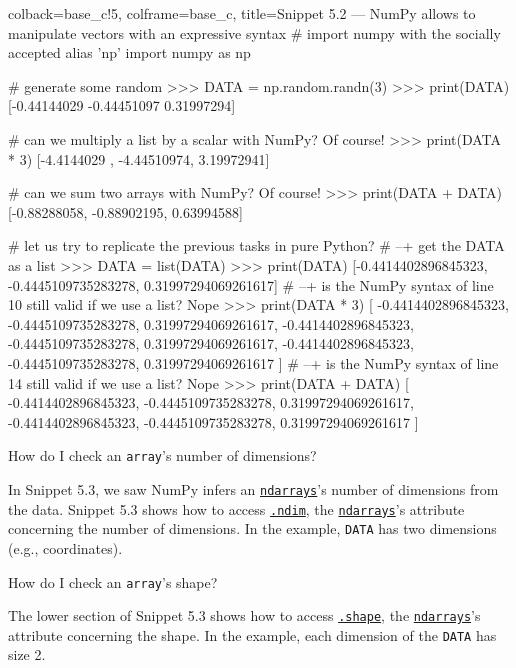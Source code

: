 \documentclass[a4paper,11pt]{book}
\newcommand{\question}[1]{%
    \begin{tcolorbox}[colback=comp_c!10,colframe=comp_c,sidebyside align=top,width=\linewidth,before skip=1ex]
        #1
    \end{tcolorbox}
    \switchcolumn%
}
\newcommand{\note}[1]{%
    \begin{tcolorbox}[colback=white!0,colframe=white!10,width=\linewidth,before skip=1ex]
        #1
    \end{tcolorbox}
}
\begin{document}
\begin{pythoncode}[linenos=true,]{colback=base_c!5, colframe=base_c, title=\sffamily Snippet 5.2 --- NumPy allows to manipulate vectors with an expressive syntax}
# import numpy with the socially accepted alias 'np'
import numpy as np

# generate some random
>>> DATA = np.random.randn(3)
>>> print(DATA)
[-0.44144029 -0.44451097  0.31997294]

# can we multiply a list by a scalar with NumPy? Of course!
>>> print(DATA * 3)
[-4.4144029 , -4.44510974,  3.19972941]

# can we sum two arrays with NumPy? Of course!
>>> print(DATA + DATA) 
[-0.88288058, -0.88902195,  0.63994588]

# let us try to replicate the previous tasks in pure Python?
# --+ get the DATA as a list
>>> DATA = list(DATA)
>>> print(DATA)
[-0.4414402896845323, -0.4445109735283278, 0.31997294069261617]
# --+ is the NumPy syntax of line 10 still valid if we use a list? Nope
>>> print(DATA * 3) 
[
-0.4414402896845323, -0.4445109735283278, 0.31997294069261617,
-0.4414402896845323, -0.4445109735283278, 0.31997294069261617,
-0.4414402896845323, -0.4445109735283278, 0.31997294069261617
]
# --+ is the NumPy syntax of line 14 still valid if we use a list? Nope
>>> print(DATA + DATA) 
[
-0.4414402896845323, -0.4445109735283278, 0.31997294069261617,
-0.4414402896845323, -0.4445109735283278, 0.31997294069261617
]
\end{pythoncode}
\clearpage

\begin{paracol}{2}
	\question{\raggedright How do I check an \texttt{array}'s number of dimensions?}
	\note{In Snippet 5.3, we saw NumPy infers an \href{https://numpy.org/doc/stable/reference/arrays.ndarray.html}{\texttt{ndarrays}}'s number of dimensions from the data. Snippet 5.3 shows how to access \href{https://numpy.org/doc/stable/reference/generated/numpy.ndarray.ndim.html\#numpy.ndarray.ndim}{\texttt{.ndim}}, the \href{https://numpy.org/doc/stable/reference/arrays.ndarray.html}{\texttt{ndarrays}}'s attribute concerning the number of dimensions. In the example, \texttt{DATA} has two dimensions (e.g., coordinates).}
\end{paracol}

\begin{paracol}{2}
	\question{\raggedright How do I check an \texttt{array}'s shape?}
	\note{The lower section of Snippet 5.3 shows how to access \href{https://numpy.org/doc/stable/reference/generated/numpy.ndarray.shape.html\#numpy.ndarray.shape}{\texttt{.shape}}, the \href{https://numpy.org/doc/stable/reference/arrays.ndarray.html}{\texttt{ndarrays}}'s attribute concerning the shape. In the example, each dimension of the \texttt{DATA} has size 2.}
\end{paracol}
\end{document}
